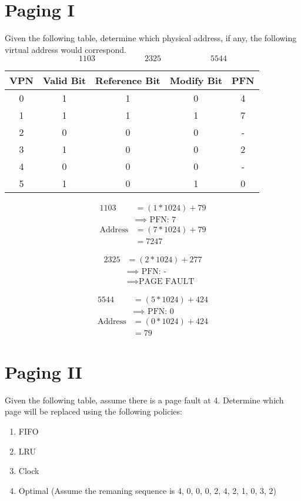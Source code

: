 \documentclass{article}
\begin{document}
\section{Paging I}
Given the following table, determine which physical address, if any, the following virtual address would correspond.
\[
1103\qquad\qquad\qquad 2325\qquad\qquad\qquad 5544
\]

\vspace{0.5cm}
\begin{center}
\begin{tabular}{|c|c|c|c|c|}
\hline
VPN & Valid Bit & Reference Bit & Modify Bit & PFN\\
\hline
0 & 1 & 1 & 0 & 4\\
\hline
1 & 1 & 1 & 1 & 7\\
\hline
2 & 0 & 0 & 0 & -\\
\hline
3 & 1 & 0 & 0 & 2\\
\hline
4 & 0 & 0 & 0 & -\\
\hline
5 & 1 & 0 & 1 & 0\\
\hline
\end{tabular}
\end{center}
\begin{minipage}[t]{0.3\textwidth}
\begin{align*}
1103 &= (1 * 1024) + 79\\
&\implies\text{ PFN: 7}\\
\text{Address} &= (7 * 1024) + 79\\
&= 7247
\end{align*}
\end{minipage}
\begin{minipage}[t]{0.3\textwidth}
\begin{align*}
2325 &= (2 * 1024) + 277\\
&\implies\text{ PFN: -}\\
&\implies\text{PAGE FAULT}
\end{align*}
\end{minipage}
\begin{minipage}[t]{0.3\textwidth}
\begin{align*}
5544 &= (5 * 1024) + 424\\
&\implies\text{ PFN: 0}\\
\text{Address} &= (0 * 1024) + 424\\
&= 79
\end{align*}
\end{minipage}
\newpage



\section{Paging II}
Given the following table, assume there is a page fault at 4.
Determine which page will be replaced using the following policies:
\begin{enumerate}
\item FIFO
\item LRU
\item Clock
\item Optimal (Assume the remaning sequence is 4, 0, 0, 0, 2, 4, 2, 1, 0, 3, 2)
\end{enumerate}
\end{document}
